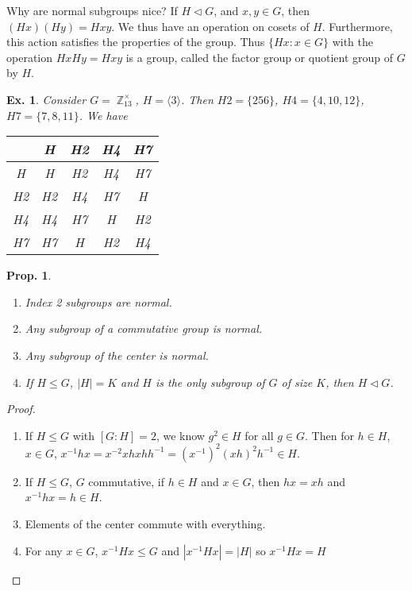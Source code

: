 \documentclass[12pt, a4paper]{book}
\DeclareMathOperator{\Z}{\mathbb{Z}}
\newtheorem{proposition}[theorem]{Prop.}
\newtheorem{example}[theorem]{Ex.}
\theoremstyle{nonumberplain}
\newtheorem{proof}{Proof}
\begin{document}
Why are normal subgroups nice?
If $H\triangleleft G$, and $x,y\in G$, then $(Hx)(Hy)=Hxy$.
We thus have an operation on cosets of $H$.
Furthermore, this action satisfies the properties of the group.
Thus $\{Hx:x\in G\}$ with the operation $HxHy=Hxy$ is a group, called the factor group or quotient group of $G$ by $H$.
\begin{example}
    Consider $G=\Z^\times_{13}$, $H=\langle 3\rangle$.
    Then $H2=\{256\}$, $H4=\{4,10,12\}$, $H7=\{7,8,11\}$.
    We have
    \begin{tabular}{c|c|c|c|c|}
        &H&H2&H4&H7\\
        \hline
        H &H&H2&H4&H7\\
        H2&H2&H4&H7&H\\
        H4&H4&H7&H&H2\\
        H7&H7&H&H2&H4
    \end{tabular}
\end{example}
\begin{proposition}
    \begin{enumerate}
        \item Index 2 subgroups are normal.
        \item Any subgroup of a commutative group is normal.
        \item Any subgroup of the center is normal.
        \item If $H\leq G$, $|H|=K$ and $H$ is the only subgroup of $G$ of size $K$, then $H\triangleleft G$.
    \end{enumerate}
\end{proposition}
\begin{proof}
    \begin{enumerate}
        \item If $H\leq G$ with $[G:H]=2$, we know $g^2\in H$ for all $g\in G$.
            Then for $h\in H$, $x\in G$, $x^{-1}hx=x^{-2}xhxhh^{-1}=(x^{-1})^2(xh)^2h^{-1}\in H$.
        \item If $H\leq G$, $G$ commutative, if $h\in H$ and $x\in G$, then $hx=xh$ and $x^{-1}hx=h\in H$.
        \item Elements of the center commute with everything.
        \item For any $x\in G$, $x^{-1}Hx\leq G$ and $|x^{-1}Hx|=|H|$ so $x^{-1}Hx=H$
    \end{enumerate}
\end{proof}
\end{document}
